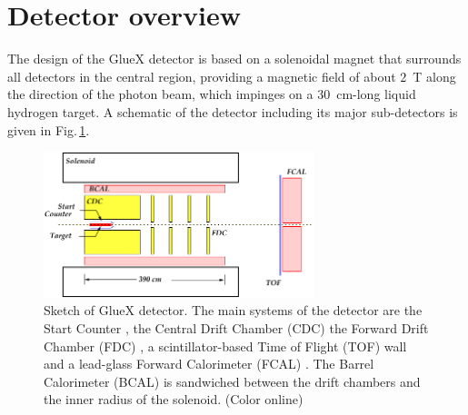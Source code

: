 
\section{Detector overview \label{sec:overview}}
The design of the GlueX detector \cite{Ghoul:2015ifw} is based on a solenoidal magnet that surrounds all detectors in the central region, providing a magnetic field of about $2$~T along the direction of the photon beam, which impinges on a 
$30$~cm-long liquid hydrogen target.  A schematic of the detector including its major sub-detectors is given in Fig.\,\ref{fig:gluexsketch}.
\begin{figure}[htp]\centering
\includegraphics[width=0.7\textwidth]{figures/GlueX_Sketch.pdf}  
\caption{\label{fig:gluexsketch}          
  Sketch of GlueX detector.  The main systems of the detector are the Start Counter \cite{hdnote3064}, the Central Drift Chamber (CDC) \cite{VanHaarlem:2010yq} the Forward Drift Chamber (FDC) \cite{Pentchev2017281}, a scintillator-based Time of Flight (TOF) wall and a lead-glass Forward Calorimeter (FCAL) \cite{MORIYA201360}. The Barrel Calorimeter (BCAL) is sandwiched between the drift chambers and the inner radius of the solenoid.  (Color online)
  }   
\end{figure}
